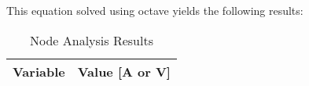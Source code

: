 This equation solved using octave yields the following results:

  \begin{table}[h]
    \centering
    \begin{tabular}{|l|r|}
      \hline    
      {\bf Variable} & {\bf Value [A or V]} \\ \hline
      
    \end{tabular}
    \caption{Node Analysis Results}
    \label{tab:nodeA}
  \end{table}
